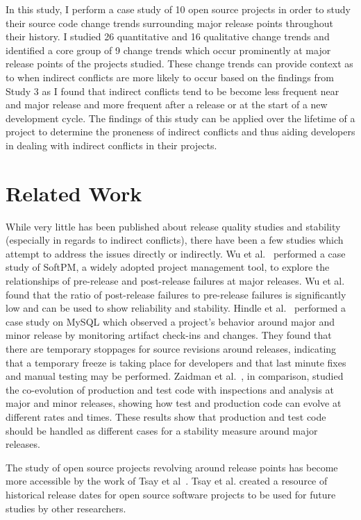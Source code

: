 In this study, I perform a case study of 10 open source projects in order to study their source code change trends surrounding major release points
throughout their history. I studied 26 quantitative and 16 qualitative change trends and identified a core group of 9 change trends which occur
prominently at major release points of the projects studied. These change trends can provide context as to when indirect conflicts are more likely
to occur based on the findings from Study 3 as I found that indirect conflicts tend to be become less frequent near and major release and more
frequent after a release or at the start of a new development cycle. The findings of this study can be applied over the lifetime of a project
to determine the proneness of indirect conflicts and thus aiding developers in dealing with indirect conflicts in their projects.

\section{Related Work}
\label{sec:rel}
While very little has been published about release quality studies and stability (especially in regards to
indirect conflicts), there have been a few studies which attempt to address the issues directly
or indirectly. Wu et al.~\cite{Wu:2008:QAF} performed a case study of SoftPM, a widely adopted project management tool, to explore the relationships of
pre-release and post-release failures at major releases. Wu et al. found that the ratio of post-release failures to pre-release failures is significantly low
and can be used to show reliability and stability. Hindle et al.~\cite{Hindle:2007:RPD} performed a case study on MySQL which observed a project's behavior
around major and minor release by monitoring artifact check-ins and changes. They found that there are temporary stoppages for source revisions around releases,
indicating that a temporary freeze is taking place for developers and that last minute fixes and manual testing may be performed.
Zaidman et al.~\cite{Zaidman:2011:SCP}, in comparison, studied the co-evolution of production and test code with inspections and analysis
at major and minor releases, showing how test and production code can evolve at different rates and times. These results show that production
and test code should be handled as different cases for a stability measure around major releases. 

The study of open source projects revolving around release points has become more accessible by the work of Tsay et al~\cite{Tsay:2011:EMO}. Tsay et al. created
a resource of historical release dates for open source software projects to be used for future studies by other researchers.

